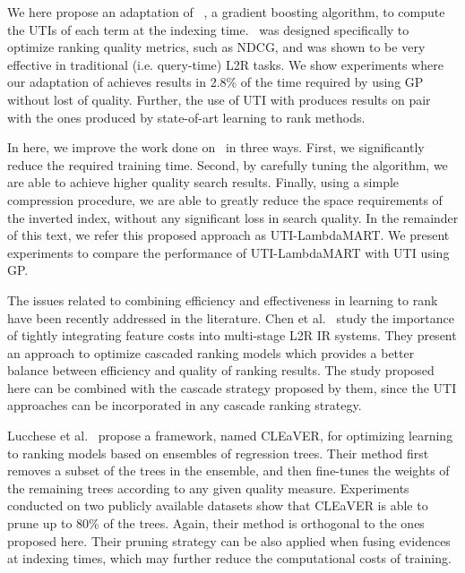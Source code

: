 \documentclass[preprint,review,10pt,3p]{elsarticle}
\begin{document}
We  here propose an adaptation of \lambdamart~\cite{wu2010lambdamart}, a gradient boosting algorithm, to compute the UTIs of each term at the indexing time. \lambdamart\ was designed specifically to optimize ranking quality metrics, such as NDCG, and was shown to be very effective in traditional (i.e. query-time) L2R tasks. We show experiments where  our adaptation of \lambdamart achieves results in 2.8\% of the time required by \lepref using GP without lost of quality. Further, the use of UTI with \lambdamart produces results on pair with the ones produced by state-of-art learning to rank methods.


In here, we improve the work done on \lepref\ in three ways. First, we significantly reduce the required training time. Second, by carefully tuning the algorithm, we are able to achieve higher quality search results. Finally, using a simple compression procedure, we are able to greatly reduce the space requirements of the inverted index, without any significant loss in search quality. In the remainder of this text, we refer this 
proposed approach as UTI-LambdaMART. We present experiments to compare the performance of UTI-LambdaMART with UTI using GP.



The issues related to combining efficiency and effectiveness in learning to rank have been recently addressed in the literature. Chen et al.~\cite{Chen2017} study  the importance of tightly integrating feature costs into multi-stage L2R IR systems. They present an approach to optimize cascaded ranking models  which provides a better balance between efficiency and quality of ranking results.  The study proposed here can be combined with the cascade strategy proposed by them, since the UTI approaches can be  incorporated in any cascade ranking strategy.

Lucchese et al.~\cite{Lucchese2016}  propose a  framework, named CLEaVER, for optimizing  learning to ranking models based on ensembles of regression trees.  Their method first removes a subset of the trees in the ensemble, and then fine-tunes the weights of the remaining trees according to any given quality measure. Experiments conducted on two publicly available  datasets show that CLEaVER is able to prune up to 80\% of the trees. Again, their method is orthogonal to the ones proposed here. Their pruning strategy can be also applied when fusing evidences at indexing times, which may further reduce the computational costs  of training. 


\end{document}
